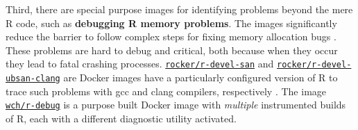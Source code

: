 Third, there are special purpose images for identifying problems beyond
the mere R code, such as \textbf{debugging R memory problems}. The
images significantly reduce the barrier to follow complex steps for
fixing memory allocation bugs
\citep[cf. Section~4.3 in][]{core_writing_1999}. These problems are hard
to debug and critical, both because when they occur they lead to fatal
crashing processes.
\href{https://github.com/rocker-org/r-devel-san}{\texttt{rocker/r-devel-san}}
and
\href{https://github.com/rocker-org/r-devel-san-clang}{\texttt{rocker/r-devel-ubsan-clang}}
are Docker images have a particularly configured version of R to trace
such problems with gcc and clang compilers, respectively
\citep[cf.~ for examples,][]{eddelbuettel_sanitizers_2014}.
The image \href{https://github.com/wch/r-debug}{\texttt{wch/r-debug}} is
a purpose built Docker image with \emph{multiple} instrumented builds of
R, each with a different diagnostic utility activated.

